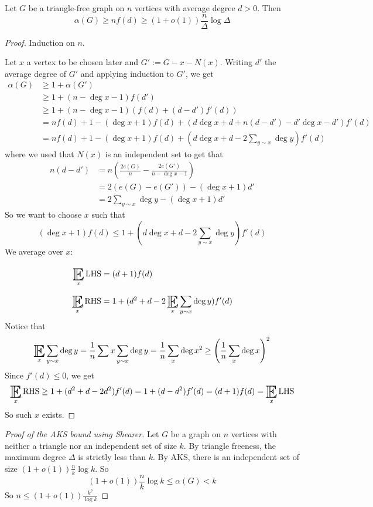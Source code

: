 \documentclass{article}
\begin{document}
\begin{thm}[Shearer]
  Let $G$ be a triangle-free graph on $n$ vertices with average degree $d > 0$.
  Then
  $$\alpha(G) \ge nf(d) \ge (1 + o(1)) \frac n\Delta \log\Delta$$
\end{thm}
\begin{proof}
  Induction on $n$.

  Let $x$ a vertex to be chosen later and $G' := G - x - N(x)$. Writing $d'$ the average degree of $G'$ and applying induction to $G'$, we get
  \begin{align*}
    \alpha(G)
    & \ge 1 + \alpha(G') \\
    & \ge 1 + (n - \deg x - 1)f(d') \\
    & \ge 1 + (n - \deg x - 1)(f(d) + (d - d')f'(d)) \\
    & = nf(d) + 1 - (\deg x + 1)f(d) + (d\deg x + d + n(d - d') - d'\deg x - d')f'(d) \\
    & = nf(d) + 1 - (\deg x + 1)f(d) + \left(d\deg x + d - 2\sum_{y \sim x} \deg y\right)f'(d)
  \end{align*}
  where we used that $N(x)$ is an independent set to get that
  \begin{align*}
    n(d - d')
    & = n \left(\frac{2e(G)}n - \frac{2e(G')}{n - \deg x - 1}\right) \\
    & = 2(e(G) - e(G')) - (\deg x + 1)d' \\
    & = 2\sum_{y \sim x} \deg y - (\deg x + 1)d'
  \end{align*}
  So we want to choose $x$ such that
  $$(\deg x + 1)f(d) \le 1 + (d\deg x + d - 2\sum_{y \sim x} \deg y)f'(d)$$
  We average over $x$:
  \begin{align*}
    \E_x \lhs & = (d + 1)f(d) \\
    \E_x \rhs & = 1 + (d^2 + d - 2\E_x\sum_{y \sim x} \deg y)f'(d)
  \end{align*}
  Notice that
  $$\E_x\sum_{y \sim x} \deg y = \frac 1n \sum x\sum_{y \sim x} \deg y = \frac 1n \sum_x \deg x^2 \ge \left(\frac 1n\sum_x \deg x\right)^2$$
  Since $f'(d) \le 0$, we get
  $$\E_x \rhs \ge 1 + (d^2 + d - 2d^2)f'(d) = 1 + (d - d^2)f'(d) = (d + 1)f(d) = \E_x \lhs$$
  So such $x$ exists.
\end{proof}

\begin{proof}[Proof of the AKS bound using Shearer]
  Let $G$ be a graph on $n$ vertices with neither a triangle nor an independent set of size $k$. By triangle freeness, the maximum degree $\Delta$ is strictly less than $k$. By AKS, there is an independent set of size $(1 + o(1))\frac nk \log k$. So
  $$(1 + o(1))\frac nk \log k \le \alpha(G) < k$$
  So $n \le (1 + o(1)) \frac{k^2}{\log k}$
\end{proof}
\end{document}
